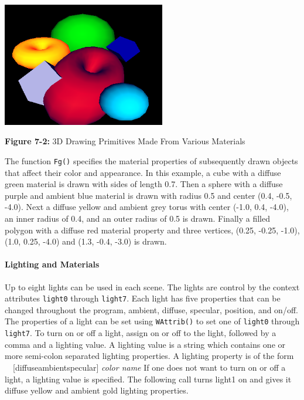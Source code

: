 
\includegraphics[width=2.8071in,height=2.1335in]{ub-img/ub-img32.png} 

{\sffamily\bfseries Figure 7-2:}
{\sffamily 3D Drawing Primitives Made From Various Materials}

\bigskip

The function \texttt{Fg()} specifies the material properties of
subsequently drawn objects that affect their color and appearance.
In this example, a cube with a diffuse green material is
drawn with sides of length 0.7. Then a sphere with a diffuse purple and
ambient blue material is drawn with radius 0.5 and center (0.4, -0.5,
-4.0). Next a diffuse yellow and ambient grey torus with center (-1.0,
0.4, -4.0), an inner radius of 0.4, and an outer radius of 0.5 is
drawn. Finally a filled polygon with a diffuse red material property
and three vertices, (0.25, -0.25, -1.0), (1.0, 0.25, -4.0) and
(1.3, -0.4, -3.0) is drawn. 

\paragraph{Lighting and Materials}
Up to eight lights can be used in each scene. The
lights are control by the context attributes \texttt{light0} through
\texttt{light7}.
Each light has five properties that can be changed throughout the
program, ambient, diffuse, specular, position, and on/off. The
properties of a light can be set using \texttt{WAttrib()} to set one of
\texttt{light0} through \texttt{light7}. To turn on or off a light,
assign on or off to the light, followed by a comma and a lighting value.
A lighting value is a string which contains one or more semi-colon
separated lighting properties. A lighting property is of the form
\newline
 \ \ [diffuse{\textbar}ambient{\textbar}specular] \textit{color
name}\newline
If one does not want to turn on or off a light, a lighting value is
specified. The following call turns light1 on and gives it diffuse
yellow and ambient gold lighting properties. 

